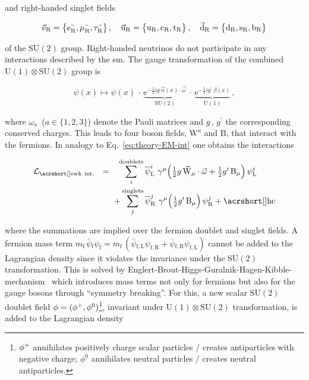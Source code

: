 and right-handed singlet fields

\begin{align}
\vec{\mathrm{e}}_\mathrm{R}=\big\{\mathrm{e}^{\rmminus}_\mathrm{R},\mu^{\rmminus}_\mathrm{R},\tau^{\rmminus}_\mathrm{R}\big\}\,,\quad\vec{\mathrm{u}}_\mathrm{R}=\big\{\mathrm{u}_\mathrm{R},\mathrm{c}_\mathrm{R},\mathrm{t}_\mathrm{R}\big\}\,,\quad\vec{\mathrm{d}}_\mathrm{R}=\big\{\mathrm{d}_\mathrm{R},\mathrm{s}_\mathrm{R},\mathrm{b}_\mathrm{R}\big\} \label{eq:theory-su2-singlets}
\end{align}

of the $\mathrm{SU(2)}$ group. Right-handed neutrinos do not participate in any interactions described by the \gls{sm}. The gauge transformation of the combined $\mathrm{U(1)}\otimes \mathrm{SU(2)}$ group is

\begin{equation}
\psi(x)\mapsto\psi(x)\,\cdot\,\underbrace{\mathrm{e}^{-\tfrac{1}{2}ig\,\vec{\alpha}(x)\cdot\vec{\omega}}}_\mathrm{SU(2)}\,\cdot\,\underbrace{\mathrm{e}^{-\tfrac{1}{2}ig^{\prime}\,\beta(x)}}_\mathrm{U(1)}\,, \label{eq:theory-u1su2-transformation}
\end{equation}

where $\omega_{a}$~($a\in\{1,2,3\}$) denote the Pauli matrices and $g$\,, $g^{\prime}$ the corresponding conserved charges. This leads to four boson fields, $\mathrm{W}^{a}$ and $\mathrm{B}$, that interact with the fermions. In analogy to Eq.~\ref{eq:theory-EM-int} one obtains the  interactions

\begin{align}
\mathcal{L}_\mathrm{\gls{ewk}~ int.}~~=\hphantom{+}\sum_{i}^\mathrm{doublets}\,&\bar{\psi}^{i}_\mathrm{L}~\gamma^{\mu}\Big(\tfrac{1}{2}g\,\vec{\mathrm{W}}_{\mu}\cdot\vec{\omega}+\tfrac{1}{2}g^{\prime}\,\mathrm{B}_{\mu}\Big)\,\psi^{i}_\mathrm{L} \nonumber\\
+\sum_{j}^\mathrm{singlets}\,&\bar{\psi}^{j}_\mathrm{R}~\gamma^{\mu}\Big(\tfrac{1}{2}g^{\prime}\,\mathrm{B}_{\mu}\Big)\,\psi^{j}_\mathrm{R} + \mathrm{\gls{hc}} \label{eq:theory-codev-su2-interaction}
\end{align}

where the summations are implied over the fermion doublet and singlet fields. A fermion mass term $ m_\mathrm{f}\,\bar{\psi}{}_\mathrm{f}\psi_\mathrm{f}=m_\mathrm{f}\,(\bar{\psi}{}_\mathrm{f,L}\psi_\mathrm{f,R}+\bar{\psi}{}_\mathrm{f,R}\psi_\mathrm{f,L})$ cannot be added to the Lagrangian density since it violates the invariance under the $\mathrm{SU(2)}$ transformation. This is solved by Englert-Brout-Higgs-Guralnik-Hagen-Kibble-mechanism~\cite{HIGGS1964132,PhysRevLett.13.508,PhysRevLett.13.321,PhysRevLett.13.585} which introduces mass terms not only for fermions but also for the gauge bosons through ``symmetry breaking''. For this, a new scalar $\mathrm{SU(2)}$ doublet field $\phi=(\phi^{+},\phi^{0})$\footnote{$\phi^{+}$ annihilates positively charge scalar particles / creates antiparticles with negative charge; $\phi^{0}$ annihilates neutral particles / creates neutral antiparticles.}, invariant under $\mathrm{U(1)}\otimes\mathrm{SU(2)}$ transformation, is added to the Lagrangian density

